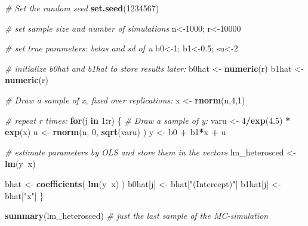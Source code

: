\documentclass[]{book}
\newenvironment{Shaded}{\begin{snugshade}}{\end{snugshade}}
\newcommand{\CommentTok}[1]{\textcolor[rgb]{0.56,0.35,0.01}{\textit{#1}}}
\newcommand{\ControlFlowTok}[1]{\textcolor[rgb]{0.13,0.29,0.53}{\textbf{#1}}}
\newcommand{\DecValTok}[1]{\textcolor[rgb]{0.00,0.00,0.81}{#1}}
\newcommand{\FloatTok}[1]{\textcolor[rgb]{0.00,0.00,0.81}{#1}}
\newcommand{\KeywordTok}[1]{\textcolor[rgb]{0.13,0.29,0.53}{\textbf{#1}}}
\newcommand{\NormalTok}[1]{#1}
\newcommand{\OperatorTok}[1]{\textcolor[rgb]{0.81,0.36,0.00}{\textbf{#1}}}
\newcommand{\StringTok}[1]{\textcolor[rgb]{0.31,0.60,0.02}{#1}}
\begin{document}
\begin{Shaded}
\begin{Highlighting}[]
\CommentTok{# Set the random seed}
\KeywordTok{set.seed}\NormalTok{(}\DecValTok{1234567}\NormalTok{)}

\CommentTok{# set sample size and number of simulations}
\NormalTok{n<-}\DecValTok{1000}\NormalTok{; r<-}\DecValTok{10000}

\CommentTok{# set true parameters: betas and sd of u}
\NormalTok{b0<-}\DecValTok{1}\NormalTok{; b1<-}\FloatTok{0.5}\NormalTok{; su<-}\DecValTok{2}

\CommentTok{# initialize b0hat and b1hat to store results later:}
\NormalTok{b0hat <-}\StringTok{ }\KeywordTok{numeric}\NormalTok{(r)}
\NormalTok{b1hat <-}\StringTok{ }\KeywordTok{numeric}\NormalTok{(r)}

\CommentTok{# Draw a sample of x, fixed over replications:}
\NormalTok{x <-}\StringTok{ }\KeywordTok{rnorm}\NormalTok{(n,}\DecValTok{4}\NormalTok{,}\DecValTok{1}\NormalTok{)}

\CommentTok{# repeat r times:}
\ControlFlowTok{for}\NormalTok{(j }\ControlFlowTok{in} \DecValTok{1}\OperatorTok{:}\NormalTok{r) \{}
  \CommentTok{# Draw a sample of y:}
\NormalTok{  varu <-}\StringTok{ }\DecValTok{4}\OperatorTok{/}\KeywordTok{exp}\NormalTok{(}\FloatTok{4.5}\NormalTok{) }\OperatorTok{*}\StringTok{ }\KeywordTok{exp}\NormalTok{(x)}
\NormalTok{  u <-}\StringTok{ }\KeywordTok{rnorm}\NormalTok{(n, }\DecValTok{0}\NormalTok{, }\KeywordTok{sqrt}\NormalTok{(varu) )}
\NormalTok{  y <-}\StringTok{ }\NormalTok{b0 }\OperatorTok{+}\StringTok{ }\NormalTok{b1}\OperatorTok{*}\NormalTok{x }\OperatorTok{+}\StringTok{ }\NormalTok{u}
  
  \CommentTok{# estimate parameters by OLS and store them in the vectors}
\NormalTok{  lm_heterosced <-}\StringTok{ }\KeywordTok{lm}\NormalTok{(y}\OperatorTok{~}\NormalTok{x)}
  
\NormalTok{  bhat <-}\StringTok{ }\KeywordTok{coefficients}\NormalTok{( }\KeywordTok{lm}\NormalTok{(y}\OperatorTok{~}\NormalTok{x) )}
\NormalTok{  b0hat[j] <-}\StringTok{ }\NormalTok{bhat[}\StringTok{"(Intercept)"}\NormalTok{]}
\NormalTok{  b1hat[j] <-}\StringTok{ }\NormalTok{bhat[}\StringTok{"x"}\NormalTok{]}
\NormalTok{\}}
\end{Highlighting}
\end{Shaded}

\begin{Shaded}
\begin{Highlighting}[]
\KeywordTok{summary}\NormalTok{(lm_heterosced) }\CommentTok{# just the last sample of the MC-simulation}
\end{Highlighting}
\end{Shaded}
\end{document}
